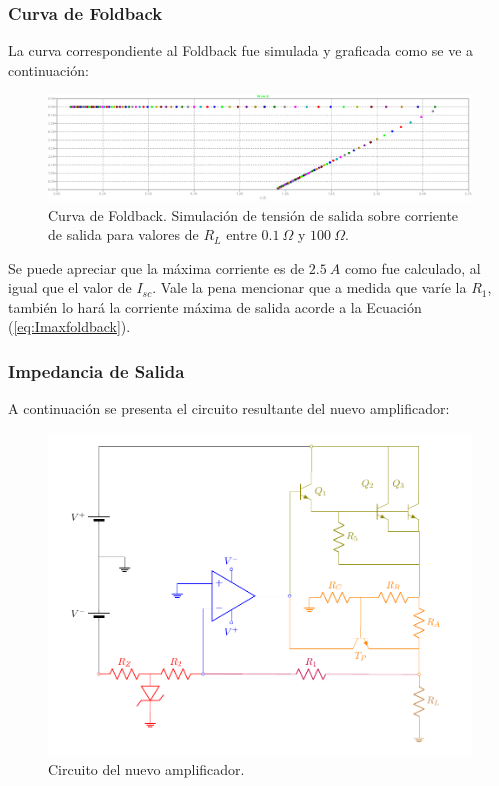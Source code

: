 \subsubsection{Curva de Foldback}
La curva correspondiente al Foldback fue simulada y graficada como se ve a continuación:
\begin{figure}[H]
\centering
	\includegraphics[width=1\textwidth]{ImagenesEjercicio2/curvefoldback.png}
	\caption{Curva de Foldback. Simulación de tensión de salida sobre corriente de salida para valores de $R_L$ entre $0.1 \ \Omega$ y $100 \ \Omega$.}
	\label{fig:GraficoFOldbacki}
\end{figure}

Se puede apreciar que la máxima corriente es de $2.5 \ A$ como fue calculado, al igual que el valor de $I_{sc}$. Vale la pena mencionar que a medida que varíe la $R_1$, también lo hará la corriente máxima de salida acorde a la Ecuación (\ref{eq:Imaxfoldback}).

\subsubsection{Impedancia de Salida}
A continuación se presenta el circuito resultante del nuevo amplificador:
\begin{figure}[H]
\centering
	\includegraphics[width=\textwidth, page=9]{ImagenesEjercicio2/Regulador.pdf}
	\caption{Circuito del nuevo amplificador.}
	\label{fig:nuevoampi}
\end{figure}

